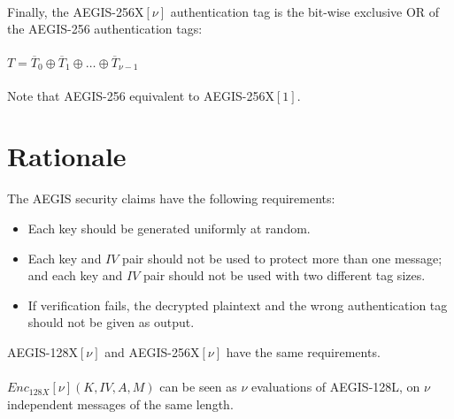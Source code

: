 \documentclass[envcountsame,runningheads,notitlepage]{llncs}
\begin{document}
\paragraph{}

Finally, the AEGIS-256X$[\nu]$ authentication tag is the bit-wise exclusive OR of the AEGIS-256 authentication tags:

\paragraph{}

\begin{math}
  T = \overline{T}_0 \oplus \overline{T}_1 \oplus \ldots \oplus \overline{T}_{\nu-1}
\end{math}

\paragraph{}

Note that AEGIS-256 equivalent to AEGIS-256X$[1]$.

\section{Rationale}
\label{sec:rationale}

The AEGIS security claims have the following requirements:

\begin{itemize}
  \item Each key should be generated uniformly at random.
  \item Each key and $IV$ pair should not be used to protect more than one message; and each key and $IV$ pair should not be used with two different tag sizes.
  \item If verification fails, the decrypted plaintext and the wrong authentication tag should not be given as output.
\end{itemize}

AEGIS-128X$[\nu]$ and AEGIS-256X$[\nu]$ have the same requirements.

\paragraph{}

$Enc_{128X}[\nu](K, IV, A, M)$ can be seen as $\nu$ evaluations of AEGIS-128L, on $\nu$ independent messages of the same length.

\paragraph{}
\end{document}
